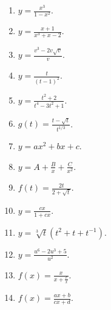 \begin{problem}
\begin{multicols}{3}
\begin{enumerate}
\item $y=\frac{x^3}{1-x^2}$.
\item $y=\frac{x+1}{x^3+x-2}$.
\item $y=\frac{v^3-2v\sqrt{v}}{v}$.
\item $y=\frac{t}{(t-1)^2}$.
\item $y=\frac{t^2+2}{t^4-3t^2+1}$.
\item $g(t)=\frac{t-\sqrt{t}}{t^{1/3}}$.
\item $y=a x^2+b x + c$.
\item $y=A+\frac{B}x +\frac{C}{x^2}$.
\item $f(t)=\frac{2t}{2+\sqrt{t}}$.
\item $y=\frac{c x}{1+c x}$.
\item $y=\sqrt[3]{t}(t^2+t+t^{-1}) $.
\item $y=\frac{u^6-2u^3+5}{u^2}$.
\item $f(x)=\frac{x}{x+\frac{c}{x}}$.
\item $f(x)=\frac{a x+b}{c x+ d}$.
\end{enumerate}
\end{multicols}
\end{problem}
